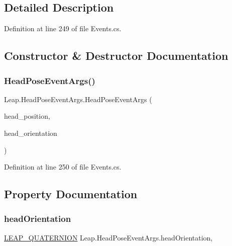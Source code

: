 \subsection{Detailed Description}


Definition at line 249 of file Events.\+cs.



\subsection{Constructor \& Destructor Documentation}
\mbox{\label{class_leap_1_1_head_pose_event_args_a5651808cc1c843e5bab43f0d7009cb5e}} 
\subsubsection{\texorpdfstring{HeadPoseEventArgs()}{HeadPoseEventArgs()}}
{\footnotesize\ttfamily Leap.\+Head\+Pose\+Event\+Args.\+Head\+Pose\+Event\+Args (\begin{DoxyParamCaption}\item[{\mbox{\hyperlink{struct_leap_internal_1_1_l_e_a_p___v_e_c_t_o_r}{L\+E\+A\+P\+\_\+\+V\+E\+C\+T\+OR}}}]{head\+\_\+position,  }\item[{\mbox{\hyperlink{struct_leap_internal_1_1_l_e_a_p___q_u_a_t_e_r_n_i_o_n}{L\+E\+A\+P\+\_\+\+Q\+U\+A\+T\+E\+R\+N\+I\+ON}}}]{head\+\_\+orientation }\end{DoxyParamCaption})}



Definition at line 250 of file Events.\+cs.



\subsection{Property Documentation}
\mbox{\label{class_leap_1_1_head_pose_event_args_a754dd4e0a1065b6e06beefcfa2a9fa2c}} 
\subsubsection{\texorpdfstring{headOrientation}{headOrientation}}
{\footnotesize\ttfamily \mbox{\hyperlink{struct_leap_internal_1_1_l_e_a_p___q_u_a_t_e_r_n_i_o_n}{L\+E\+A\+P\+\_\+\+Q\+U\+A\+T\+E\+R\+N\+I\+ON}} Leap.\+Head\+Pose\+Event\+Args.\+head\+Orientation\hspace{0.3cm}{\ttfamily [get]}, {\ttfamily [set]}}



